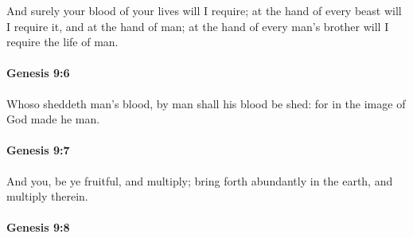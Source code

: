 			And surely your blood of your lives will I require; at the hand of every beast will I require it, and at the hand of man; at the hand of every man's brother will I require the life of man.


		\paragraph{Genesis 9:6} %
			\label{GENESIS-9-6}

			Whoso sheddeth man's blood, by man shall his blood be shed: for in the image of God made he man.


		\paragraph{Genesis 9:7} %
			\label{GENESIS-9-7}

			And you, be ye fruitful, and multiply; bring forth abundantly in the earth, and multiply therein.


		\paragraph{Genesis 9:8} %
			\label{GENESIS-9-8}

